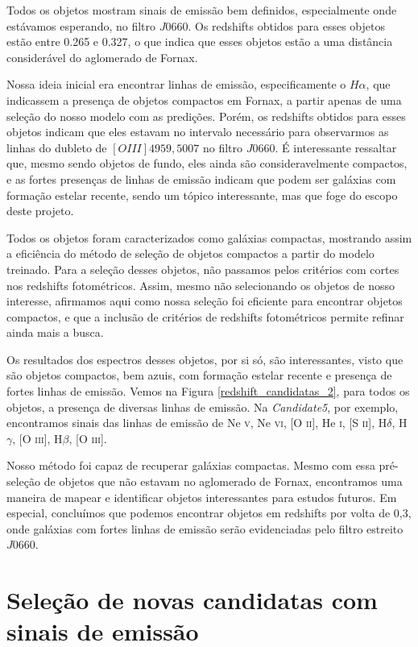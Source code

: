 Todos os objetos mostram sinais de emissão bem definidos, especialmente onde estávamos esperando, no filtro $J0660$. Os redshifts obtidos para esses objetos estão entre 0.265 e 0.327, o que indica que esses objetos estão a uma distância considerável do aglomerado de Fornax.

Nossa ideia inicial era encontrar linhas de emissão, especificamente o $H\alpha$, que indicassem a presença de objetos compactos em Fornax, a partir apenas de uma seleção do nosso modelo com as predições. Porém, os redshifts obtidos para esses objetos indicam que eles estavam no intervalo necessário para observarmos as linhas do dubleto de $[OIII]4959,5007$ no filtro $J0660$. É interessante ressaltar que, mesmo sendo objetos de fundo, eles ainda são consideravelmente compactos, e as fortes presenças de linhas de emissão indicam que podem ser galáxias com formação estelar recente, sendo um tópico interessante, mas que foge do escopo deste projeto.

Todos os objetos foram caracterizados como galáxias compactas, mostrando assim a eficiência do método de seleção de objetos compactos a partir do modelo treinado. Para a seleção desses objetos, não passamos pelos critérios com cortes nos redshifts fotométricos. Assim, mesmo não selecionando os objetos de nosso interesse, afirmamos aqui como nossa seleção foi eficiente para encontrar objetos compactos, e que a inclusão de critérios de redshifts fotométricos permite refinar ainda mais a busca.

Os resultados dos espectros desses objetos, por si só, são interessantes, visto que são objetos compactos, bem azuis, com formação estelar recente e presença de fortes linhas de emissão. Vemos na Figura \ref{redshift_candidatas_2}, para todos os objetos, a presença de diversas linhas de emissão. Na \textit{Candidate5}, por exemplo, encontramos sinais das linhas de emissão de Ne \textsc{v}, Ne \textsc{vi}, [O \textsc{ii}], He \textsc{i}, [S \textsc{ii}], H$\delta$, H$\gamma$, [O \textsc{iii}], H$\beta$, [O \textsc{iii}].

Nosso método foi capaz de recuperar galáxias compactas. Mesmo com essa pré-seleção de objetos que não estavam no aglomerado de Fornax, encontramos uma maneira de mapear e identificar objetos interessantes para estudos futuros. Em especial, concluímos que podemos encontrar objetos em redshifts por volta de 0,3, onde galáxias com fortes linhas de emissão serão evidenciadas pelo filtro estreito $J0660$.

\section{Seleção de novas candidatas com sinais de emissão} \label{subsec:candidatas_emissao}

